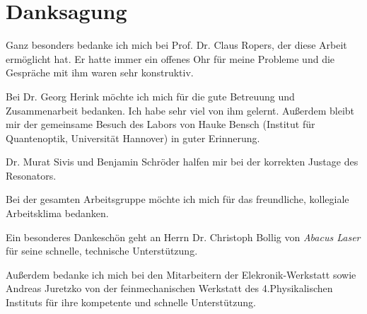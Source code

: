 \documentclass[bachelor,       %
               twoside,        %
               BCOR10mm,       %
               liststotoc,nomtotoc,bibtotoc, %
               english,ngerman, %
               final,          %
               ]{GAUBM}
\begin{document}
\chapter*{Danksagung}
\parindent0mm
\parskip2mm
Ganz besonders bedanke ich mich bei Prof. Dr. Claus Ropers, der diese Arbeit ermöglicht hat.
Er hatte immer ein offenes Ohr für meine Probleme und die Gespräche mit ihm waren sehr konstruktiv.

Bei Dr. Georg Herink möchte ich mich für die gute Betreuung und Zusammenarbeit bedanken.
Ich habe sehr viel von ihm gelernt.
Außerdem bleibt mir der gemeinsame Besuch des Labors von Hauke Bensch (Institut für Quantenoptik, Universität Hannover) in guter Erinnerung.

Dr. Murat Sivis und Benjamin Schröder halfen mir bei der korrekten Justage des Resonators.

Bei der gesamten Arbeitsgruppe möchte ich mich für das freundliche, kollegiale Arbeitsklima bedanken.

Ein besonderes Dankeschön geht an Herrn Dr. Christoph Bollig von \textit{Abacus Laser} für seine schnelle, technische Unterstützung.

Außerdem bedanke ich mich bei den Mitarbeitern der Elekronik-Werkstatt sowie Andreas Juretzko von der feinmechanischen Werkstatt des 4.Physikalischen Instituts für ihre kompetente und schnelle Unterstützung.

\cleardoublepage
\Declaration
\end{document}
